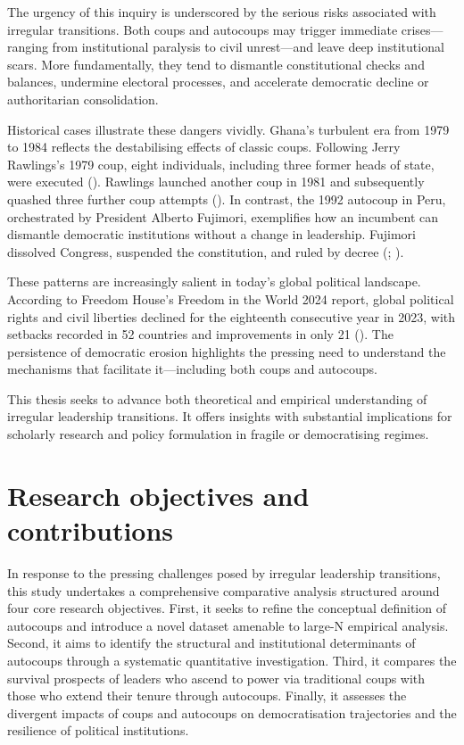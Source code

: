 \documentclass[
  12pt,
]{report}
\begin{document}
The urgency of this inquiry is underscored by the serious risks
associated with irregular transitions. Both coups and autocoups may
trigger immediate crises---ranging from institutional paralysis to civil
unrest---and leave deep institutional scars. More fundamentally, they
tend to dismantle constitutional checks and balances, undermine
electoral processes, and accelerate democratic decline or authoritarian
consolidation.

Historical cases illustrate these dangers vividly. Ghana's turbulent era
from 1979 to 1984 reflects the destabilising effects of classic coups.
Following Jerry Rawlings's 1979 coup, eight individuals, including three
former heads of state, were executed
(). Rawlings launched another
coup in 1981 and subsequently quashed three further coup attempts
(). In contrast, the 1992
autocoup in Peru, orchestrated by President Alberto Fujimori,
exemplifies how an incumbent can dismantle democratic institutions
without a change in leadership. Fujimori dissolved Congress, suspended
the constitution, and ruled by decree
(;
).

These patterns are increasingly salient in today's global political
landscape. According to Freedom House's Freedom in the World 2024
report, global political rights and civil liberties declined for the
eighteenth consecutive year in 2023, with setbacks recorded in 52
countries and improvements in only 21
(). The
persistence of democratic erosion highlights the pressing need to
understand the mechanisms that facilitate it---including both coups and
autocoups.

This thesis seeks to advance both theoretical and empirical
understanding of irregular leadership transitions. It offers insights
with substantial implications for scholarly research and policy
formulation in fragile or democratising regimes.

\section{Research objectives and
contributions}\label{research-objectives-and-contributions}

In response to the pressing challenges posed by irregular leadership
transitions, this study undertakes a comprehensive comparative analysis
structured around four core research objectives. First, it seeks to
refine the conceptual definition of autocoups and introduce a novel
dataset amenable to large-N empirical analysis. Second, it aims to
identify the structural and institutional determinants of autocoups
through a systematic quantitative investigation. Third, it compares the
survival prospects of leaders who ascend to power via traditional coups
with those who extend their tenure through autocoups. Finally, it
assesses the divergent impacts of coups and autocoups on democratisation
trajectories and the resilience of political institutions.
\end{document}
